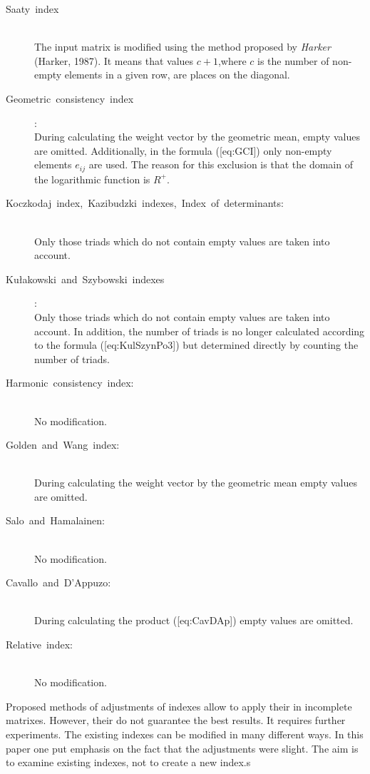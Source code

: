 \begin{description}

\item[Saaty index] \hfill \\ 
	The input matrix is modified using the method proposed by \textit{Harker} (Harker, 1987). It means that values $c+1$,where $c$ is the number of non-empty elements in a given row, are places on the diagonal.

\item[Geometric consistency index]: \hfill \\
	During calculating the weight vector by the geometric mean, empty values are omitted. Additionally, in the formula ([eq:GCI]) only non-empty elements $e_{ij}$ are used. The reason for this exclusion is that the domain of the logarithmic function is $R^{+}$.

\item[Koczkodaj index, Kazibudzki indexes, Index of determinants:] \hfill \\ 
  Only those triads which do not contain empty values are taken into account.

\item[Kułakowski and Szybowski indexes]: \hfill \\ 
	Only those triads which do not contain empty values are taken into account. In addition, the number of triads is no longer calculated according to the formula ([eq:KulSzynPo3]) but determined directly by counting the number of triads.

\item[Harmonic consistency index:] \hfill \\ 
  No modification.

\item[Golden and Wang index:] \hfill \\ 
  During calculating the weight vector by the geometric mean empty values are omitted.

\item[Salo and Hamalainen:] \hfill \\ 
  No modification.

\item[Cavallo and D'Appuzo:] \hfill \\
	During calculating the product ([eq:CavDAp]) empty values are omitted.

\item[Relative index:] \hfill \\ 
  No modification.
\end{description}

Proposed methods of adjustments of indexes allow to apply their in incomplete matrixes. However, their do not guarantee the best results. It requires further experiments. The existing indexes can be modified in many different ways. In this paper one put emphasis on the fact that the adjustments were slight. The aim is to examine existing indexes, not to create a new index.s